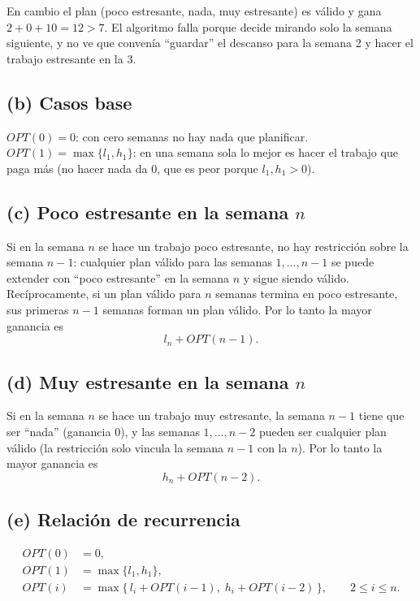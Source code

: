 En cambio el plan (poco estresante, nada, muy estresante) es válido y gana $2+0+10=12>7$. El algoritmo falla porque decide mirando solo la semana siguiente, y no ve que convenía ``guardar'' el descanso para la semana 2 y hacer el trabajo estresante en la 3.

\subsection*{(b) Casos base}

$OPT(0)=0$: con cero semanas no hay nada que planificar. $OPT(1)=\max\{l_1,h_1\}$: en una semana sola lo mejor es hacer el trabajo que paga más (no hacer nada da $0$, que es peor porque $l_1,h_1>0$).

\subsection*{(c) Poco estresante en la semana $n$}

Si en la semana $n$ se hace un trabajo poco estresante, no hay restricción sobre la semana $n-1$: cualquier plan válido para las semanas $1,\dots,n-1$ se puede extender con ``poco estresante'' en la semana $n$ y sigue siendo válido. Recíprocamente, si un plan válido para $n$ semanas termina en poco estresante, sus primeras $n-1$ semanas forman un plan válido. Por lo tanto la mayor ganancia es
\[
l_n + OPT(n-1).
\]

\subsection*{(d) Muy estresante en la semana $n$}

Si en la semana $n$ se hace un trabajo muy estresante, la semana $n-1$ tiene que ser ``nada'' (ganancia $0$), y las semanas $1,\dots,n-2$ pueden ser cualquier plan válido (la restricción solo vincula la semana $n-1$ con la $n$). Por lo tanto la mayor ganancia es
\[
h_n + OPT(n-2).
\]

\subsection*{(e) Relación de recurrencia}

\begin{align}
OPT(0) &= 0, \label{e1:b0}\\
OPT(1) &= \max\{l_1,h_1\}, \label{e1:b1}\\
OPT(i) &= \max\{\, l_i + OPT(i-1),\; h_i + OPT(i-2)\,\}, \qquad 2\le i\le n. \label{e1:rec}
\end{align}

